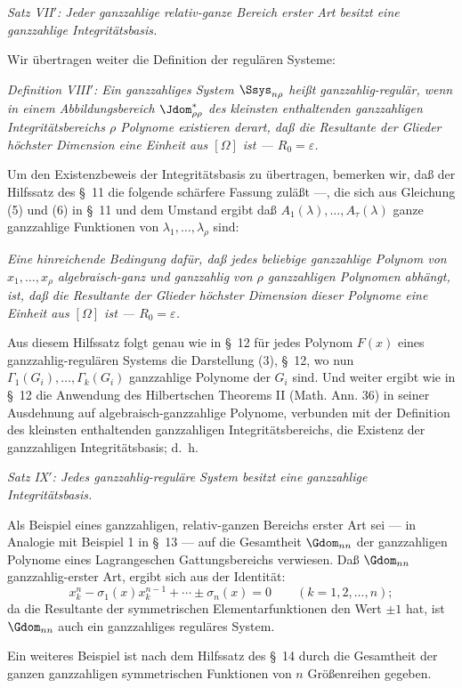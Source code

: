 \documentclass[11pt]{article}
\providecommand{\eps}{\varepsilon}
\begin{document}
\emph{Satz VII$'$: Jeder ganzzahlige relativ-ganze Bereich erster Art besitzt eine ganzzahlige Integritätsbasis.}

Wir übertragen weiter die Definition der regulären Systeme:

\emph{Definition VIII$'$: Ein ganzzahliges System $\Ssys_{n\rho}$ heißt ganzzahlig-regulär, wenn in einem Abbildungsbereich $\Jdom^*_{\rho\rho}$ des kleinsten enthaltenden ganzzahligen Integritätsbereichs $\rho$ Polynome existieren derart, daß die Resultante der Glieder höchster Dimension eine Einheit aus $[\Omega]$ ist --- $R_0=\eps$.}

Um den Existenzbeweis der Integritätsbasis zu übertragen, bemerken wir, daß der Hilfssatz des \S\ 11 die folgende schärfere Fassung zuläßt ---, die sich aus Gleichung (5) und (6) in \S\ 11 und dem Umstand ergibt daß $A_1(\lambda),
\ldots,A_\tau(\lambda)$ ganze ganzzahlige Funktionen von $\lambda_1,
\ldots,
\lambda_\rho$ sind:

\emph{Eine hinreichende Bedingung dafür, daß jedes beliebige ganzzahlige Polynom von $x_1,
\ldots,x_\rho$ algebraisch-ganz und ganzzahlig von $\rho$ ganzzahligen Polynomen abhängt, ist, daß die Resultante der Glieder höchster Dimension dieser Polynome eine Einheit aus $[\Omega]$ ist --- $R_0=\eps$.}

Aus diesem Hilfssatz folgt genau wie in \S\ 12 für jedes Polynom $F(x)$ eines ganzzahlig-regulären Systems die Darstellung (3), \S\ 12, wo nun $\Gamma_1(G_i),
\ldots,
\Gamma_k(G_i)$ ganzzahlige Polynome der $G_i$ sind. Und weiter ergibt wie in \S\ 12 die Anwendung des Hilbertschen Theorems II (Math. Ann. 36) in seiner Ausdehnung auf algebraisch-ganzzahlige Polynome, verbunden mit der Definition des kleinsten enthaltenden ganzzahligen Integritätsbereichs, die Existenz der ganzzahligen Integritätsbasis; d.~h.

\emph{Satz IX$'$: Jedes ganzzahlig-reguläre System besitzt eine ganzzahlige Integritätsbasis.}

Als Beispiel eines ganzzahligen, relativ-ganzen Bereichs erster Art sei --- in Analogie mit Beispiel 1 in \S\ 13 --- auf die Gesamtheit $\Gdom_{nn}$ der ganzzahligen Polynome eines Lagrangeschen Gattungsbereichs verwiesen. Daß $\Gdom_{nn}$ ganzzahlig-erster Art, ergibt sich aus der Identität:
\[
  x_k^n-\sigma_1(x)x_k^{n-1}+\cdots\pm\sigma_n(x)=0
  \qquad(k=1,2,
\ldots,n);
\]
da die Resultante der symmetrischen Elementarfunktionen den Wert $\pm1$ hat, ist $\Gdom_{nn}$ auch ein ganzzahliges reguläres System.

Ein weiteres Beispiel ist nach dem Hilfssatz des \S\ 14 durch die Gesamtheit der ganzen ganzzahligen symmetrischen Funktionen von $n$ Größenreihen gegeben.
\end{document}
